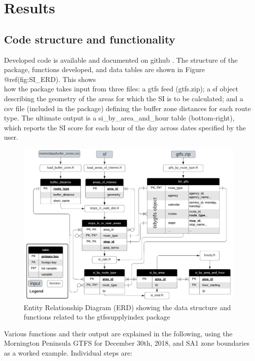 \documentclass[preprint, 3p,
authoryear]{elsarticle} %
\begin{document}
\hypertarget{results}{%
\section{Results}\label{results}}

\hypertarget{code-structure-and-functionality}{%
\subsection{Code structure and
functionality}\label{code-structure-and-functionality}}

Developed code is available and documented on github
\citep{gtfssupplyindex_github}. The structure of the package, functions
developed, and data tables are shown in Figure @ref(fig:SI\_ERD). This
shows\\
how the package takes input from three files: a gtfs feed (gtfs.zip); a
sf object describing the geometry of the areas for which the SI is to be
calculated; and a csv file (included in the package) defining the buffer
zone distances for each route type. The ultimate output is a
si\_by\_area\_and\_hour table (bottom-right), which reports the SI score
for each hour of the day across dates specified by the user.

\begin{figure}
\includegraphics[width=1\linewidth]{graphics/SI_data_structure} \caption{Entity Relationship Diagram (ERD) showing the data structure and functions related to the gtfssupplyindex package}\label{fig:SI_ERD}
\end{figure}

Various functions and their output are explained in the following, using
the Mornington Peninsula GTFS for December 30th, 2018, and SA1 zone
boundaries as a worked example. Individual steps are:
\end{document}
